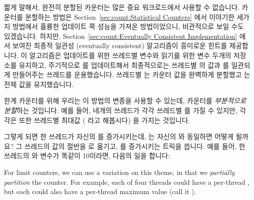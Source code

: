 짧게 말해서, 완전히 분할된 카운터는 많은 중요 워크로드에서 사용할 수 없습니다.
카운터를 분할하는 방법은 Section~\ref{sec:count:Statistical Counters} 에서
이야기한 세가지 방법에서 훌륭한 업데이트 쪽 성능을 가져온 방법이었으니,
비관적으로 보일 수도 있겠습니다.
하지만, Section~\ref{sec:count:Eventually Consistent Implementation} 에서
보여진 최종적 일관성 (eventually consistent) 알고리즘이 흥미로운 힌트를
제공합니다.
이 알고리즘은 업데이트를 위한 쓰레드별  변수와 읽기를 위한
 변수 두개의 저장소를 유지하고, 주기적으로 
를 업데이트해서 최종적으로는 쓰레드별  의 값과  를
일관되게 만들어주는  쓰레드를 운용했습니다.
쓰레드별  는 카운터 값을 완벽하게 분할했고  는
전체 값을 유지했습니다.

한계 카운터를 위해 우리는 이 방법의 변종을 사용할 수 있는데, 카운터를
\emph{부분적으로 분할}하는 것입니다.
예를 들어, 네개의 쓰레드가 각각 쓰레드별  를 가질 수 있지만, 각각은
또한 쓰레드별 최대값 ( 라고 해봅시다) 을 가지는 것입니다.

그렇게 되면 한 쓰레드가 자신의  를 증가시키는데,  는
자신의  와 동일하면 어떻게 될까요?
그 쓰레드의  값의 절반을  로 옮기고, 
를 증가시키는 트릭을 씁니다.
예를 들어, 한 쓰레드의  와  변수가 똑같이 10이라면,
다음의 일을 합니다:
\iffalse

For limit counters, we can use a variation on this theme, in that
we \emph{partially partition} the counter.
For example, each of four threads could have a per-thread
, but each could also have a per-thread maximum value
(call it ).

